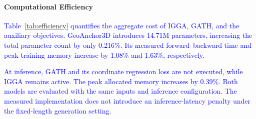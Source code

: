 \documentclass[lettersize,journal]{IEEEtran}
\begin{document}
\begin{table}[tbp]
\centering
\footnotesize
\setlength{\tabcolsep}{4.0pt}
\caption{\textbf{Efficiency comparison on one NVIDIA RTX 3090.} Both models use batch size 1 and FlashAttention-2. Inference generates 32 tokens with greedy decoding. Training time covers forward and backward computation but excludes data transfer and the optimizer step.}
\label{tab:efficiency}
\end{table}

\paragraph*{Computational Efficiency}
\textcolor{blue}{Table~\ref{tab:efficiency} quantifies the aggregate cost of IGGA, GATH, and the auxiliary objectives. GeoAnchor3D introduces 14.71M parameters, increasing the total parameter count by only 0.216\%. Its measured forward--backward time and peak training memory increase by 1.08\% and 1.63\%, respectively.}

\textcolor{blue}{At inference, GATH and its coordinate regression loss are not executed, while IGGA remains active. The peak allocated memory increases by 0.39\%. Both models are evaluated with the same inputs and inference configuration. The measured implementation does not introduce an inference-latency penalty under the fixed-length generation setting.}
\end{document}
